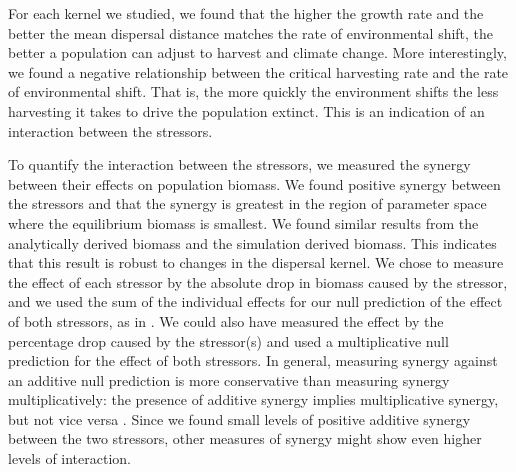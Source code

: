 \documentclass[12pt,english]{article}
\begin{document}
\begin{spacing}{1.9}
\begin{flushleft}
For each kernel we studied, we found that the higher the growth rate and the better the mean dispersal distance matches the rate of environmental shift, the better a population can adjust to harvest and climate change.  More interestingly, we found a negative relationship between the critical harvesting rate and the rate of environmental shift.  That is, the more quickly the environment shifts the less harvesting it takes to drive the population extinct.  This is an indication of an interaction between the stressors. 

To quantify the interaction between the stressors, we measured the synergy between their effects on population biomass.  We found positive synergy between the stressors and that the synergy is greatest in the region of parameter space where the equilibrium biomass is smallest.  We found similar results from the analytically derived biomass and the simulation derived biomass. This indicates that this result is robust to changes in the dispersal kernel.  We chose to measure the effect of each stressor by the absolute drop in biomass caused by the stressor, and we used the sum of the individual effects for our null prediction of the effect of both stressors, as in \citep{Crainetal2008, DarlingCote2008,Nyeetal2013}.  We could also have measured the effect by the percentage drop caused by the stressor(s) and used a multiplicative null prediction for the effect of both stressors.  In general, measuring synergy against an additive null prediction is more conservative than measuring synergy multiplicatively: the presence of additive synergy implies multiplicative synergy, but not vice versa \citep{Crainetal2008, Foltetal1999}.  Since we found small levels of positive additive synergy between the two stressors, other measures of synergy might show even higher levels of interaction. 


\end{flushleft}
\end{spacing}
\end{document}
